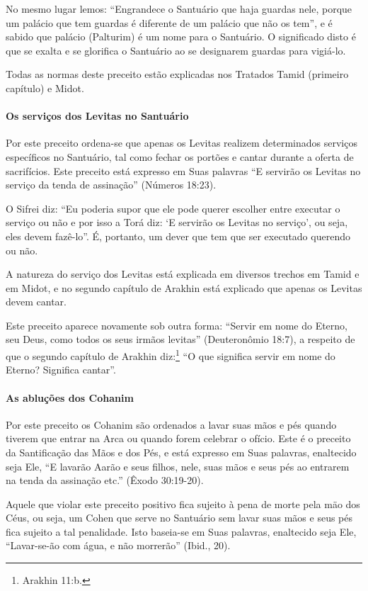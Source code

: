 No mesmo lugar lemos: ``Engrandece o Santuário que haja guardas nele,
porque um palácio que tem guardas é diferente de um palácio que não os
tem'', e é sabido que palácio (Palturim) é um nome para o Santuário. O
significado disto é que se exalta e se glorifica o Santuário ao se
designarem guardas para vigiá-lo.

Todas as normas deste preceito estão explicadas nos Tratados Tamid
(primeiro capítulo) e Midot.

\paragraph{Os serviços dos Levitas no Santuário}

Por este preceito ordena-se que apenas os Levitas realizem determinados
serviços específicos no Santuário, tal como fechar os portões e cantar
durante a oferta de sacrifícios. Este preceito está expresso em Suas
palavras ``E servirão os Levitas no serviço da tenda de assinação''
(Números 18:23).

O Sifrei diz: ``Eu poderia supor que ele pode querer escolher entre
executar o serviço ou não e por isso a Torá diz: `E servirão os Levitas
no serviço', ou seja, eles devem fazê-lo''. É, portanto, um dever que
tem que ser executado querendo ou não.

A natureza do serviço dos Levitas está explicada em diversos trechos em
Tamid e em Midot, e no segundo capítulo de Arakhin está explicado que
apenas os Levitas devem cantar.

Este preceito aparece novamente sob outra forma: ``Servir em nome do
Eterno, seu Deus, como todos os seus irmãos levitas'' (Deuteronômio
18:7), a respeito de que o segundo capítulo de Arakhin
diz:\footnote{Arakhin 11:b.} ``O que significa servir em nome do Eterno?
Significa cantar''.

\paragraph{As abluções dos Cohanim}

Por este preceito os Cohanim são ordenados a lavar suas mãos e pés
quando tiverem que entrar na Arca ou quando forem celebrar o ofício.
Este é o preceito da Santificação das Mãos e dos Pés, e está expresso em
Suas palavras, enaltecido seja Ele, ``E lavarão Aarão e seus filhos,
nele, suas mãos e seus pés ao entrarem na tenda da assinação etc.''
(Êxodo 30:19-20).

Aquele que violar este preceito positivo fica sujeito à pena de morte
pela mäo dos Céus, ou seja, um Cohen que serve no Santuário sem
lavar suas mãos e seus pés fica sujeito a tal penalidade. Isto baseia-se
em Suas palavras, enaltecido seja Ele, ``Lavar-se-ão com água, e não
morrerão'' (Ibid., 20).

